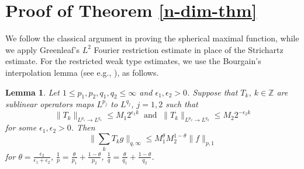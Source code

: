 \documentclass[10pt] %
{amsart}
\theoremstyle{plain}
\newtheorem{lem}[thm]{Lemma}
\numberwithin{equation}{section}
\newcommand{\Z}{\mathbb Z}
\begin{document}
 

\section{Proof of Theorem  \ref{n-dim-thm}}\label{sec:proof of high}



We follow the classical argument in \cite{Lee} proving the spherical maximal function, while 
we apply Greenleaf's $L^2$ Fourier restriction estimate in place of the Strichartz estimate.
For the restricted weak type estimates, we use the Bourgain's interpolation lemma (see e.g., \cite{B3,CSW,Lee}), as follows. 
\begin{lem}\label{Bourgain trick}
Let $1\le p_1,p_2,q_1,q_2 \le \infty$ and $\epsilon_1,\epsilon_2>0$. Suppose that $T_k$, $k\in \Z$ are sublinear operators maps $L^{p_j}$ to $L^{q_j}$, $j=1,2$ such that
\[
\big\| T_k  \big\|_{L^{p_1}\to L^{q_1}} \le M_1 2^{   \epsilon_1 k }~ \text{ and }~  \big\| T_k  \big\|_{L^{p_2}\to L^{q_2}} \le M_2 2^{ -  \epsilon_2 k} 
\]
for some $\epsilon_1, \epsilon_2 >0$. 
Then 
\[\|\sum_k T_k g \|_{q,\infty}\le M_1^{\theta} M_2^{1-\theta} \|f\|_{p,1}\] for  $\theta = \frac{\epsilon_2}{\epsilon_1+\epsilon_2}$, $\frac 1p = \frac{\theta}{p_1}+\frac{1-\theta}{p_2}$,  $\frac 1q=\frac{\theta}{q_1}+\frac{1-\theta}{q_2}$.
\end{lem}
\end{document}

